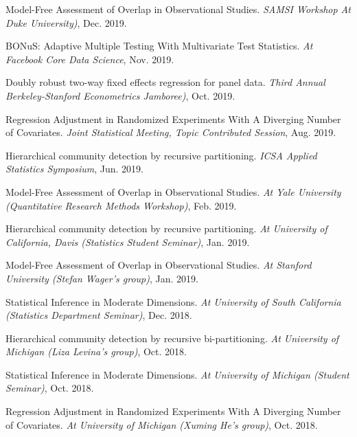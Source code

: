 \documentclass{article}
\begin{document}
\vspace{2mm}
Model-Free Assessment of Overlap in Observational Studies. \emph{SAMSI Workshop At Duke University)}, Dec. 2019.

\vspace{2mm}
BONuS: Adaptive Multiple Testing With Multivariate Test Statistics. \emph{At Facebook Core Data Science}, Nov. 2019.

\vspace{2mm}
Doubly robust two-way fixed effects regression for panel data. \emph{Third Annual Berkeley-Stanford Econometrics Jamboree)}, Oct. 2019.

\vspace{2mm}
Regression Adjustment in Randomized Experiments With A Diverging Number of Covariates. \emph{Joint Statistical Meeting, Topic Contributed Session}, Aug. 2019.

\vspace{2mm}
Hierarchical community detection by recursive partitioning. \emph{ICSA Applied Statistics Symposium}, Jun. 2019.

\vspace{2mm}
Model-Free Assessment of Overlap in Observational Studies. \emph{At Yale University (Quantitative Research Methods Workshop)}, Feb. 2019.

\vspace{2mm}
Hierarchical community detection by recursive partitioning. \emph{At University of California, Davis (Statistics Student Seminar)}, Jan. 2019.

\vspace{2mm}
Model-Free Assessment of Overlap in Observational Studies. \emph{At Stanford University (Stefan Wager's group)}, Jan. 2019.

\vspace{2mm}
Statistical Inference in Moderate Dimensions. \emph{At University of South California (Statistics Department Seminar)}, Dec. 2018.

\vspace{2mm}
Hierarchical community detection by recursive bi-partitioning. \emph{At University of Michigan (Liza Levina's group)}, Oct. 2018.

\vspace{2mm}
Statistical Inference in Moderate Dimensions. \emph{At University of Michigan (Student Seminar)}, Oct. 2018.

\vspace{2mm}
Regression Adjustment in Randomized Experiments With A Diverging Number of Covariates. \emph{At University of Michigan (Xuming He's group)}, Oct. 2018.
\end{document}
